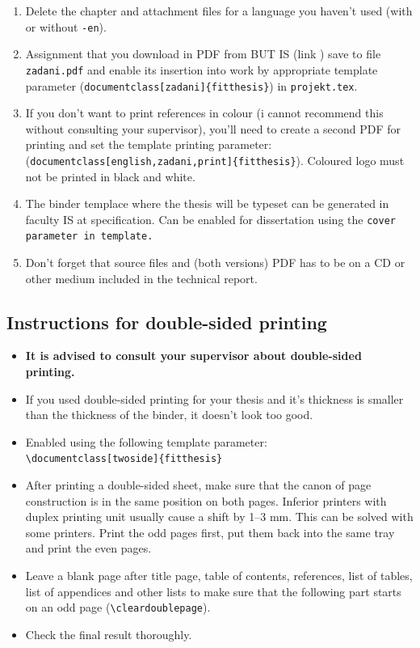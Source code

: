 \begin{enumerate}
  \item Delete the chapter and attachment files for a language you haven't used (with or without \texttt{-en}).
  \item Assignment that you download in PDF from BUT IS (link ) save to file \texttt{zadani.pdf} and enable its insertion into work by appropriate template parameter (\verb|document|\verb|class[zadani]{fitthesis}|) in \texttt{projekt.tex}.
  \item If you don't want to print references in colour (i cannot recommend this without consulting your supervisor), you'll need to create a second PDF for printing and set the template printing parameter:\\ (\verb|document|\verb|class[english,zadani,print]{fitthesis}|). Coloured logo must not be printed in black and white.
  \item The binder templace where the thesis will be typeset can be generated in faculty IS at specification. Can be enabled for dissertation using the \tt cover \rm parameter in template.
  \item Don't forget that source files and (both versions) PDF has to be on a CD or other medium included in the technical report.
\end{enumerate}

\subsection{Instructions for double-sided printing}
\begin{itemize}
\item \textbf{It is advised to consult your supervisor about double-sided printing.}
\item If you used double-sided printing for your thesis and it's thickness is smaller than the thickness of the binder, it doesn't look too good.
\item Enabled using the following template parameter:\\ \verb|\document|\verb|class[twoside]{fitthesis}|
\item After printing a double-sided sheet, make sure that the canon of page construction is in the same position on both pages. Inferior printers with duplex printing unit usually cause a shift by 1--3 mm. This can be solved with some printers. Print the odd pages first, put them back into the same tray and print the even pages.
\item Leave a blank page after title page, table of contents, references, list of tables, list of appendices and other lists to make sure that the following part starts on an odd page (\texttt{\textbackslash cleardoublepage}).
\item Check the final result thoroughly.
\end{itemize}

